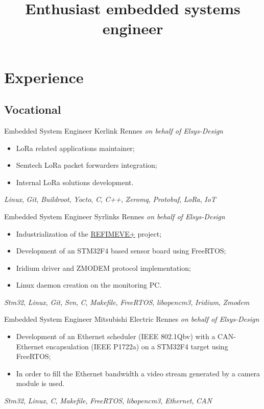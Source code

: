 \documentclass[11pt,a4paper,sans]{moderncv}
\title{Enthusiast embedded systems engineer}
\begin{document}
\makecvtitle

\section{Experience}
\subsection{Vocational}
	{Embedded System Engineer}
	{Kerlink}
	{Rennes}
	{\textit{on behalf of Elsys-Design}}
	{
		\begin{itemize}
		\item LoRa related applications maintainer;
		\item Semtech LoRa packet forwarders integration;
		\item Internal LoRa solutions development.
		\end{itemize}
		\textit{Linux},
		\textit{Git},
		\textit{Buildroot}, \textit{Yocto},
		\textit{C}, \textit{C++},
		\textit{Zeromq}, \textit{Protobuf},
		\textit{LoRa}, \textit{IoT}
	}
	{Embedded System Engineer}
	{Syrlinks}
	{Rennes}
	{\textit{on behalf of Elsys-Design}}
	{
		\begin{itemize}
		\item Industrialization of the
			\href{http://www.refimeve.fr}{REFIMEVE+} project;
		\item Development of an STM32F4 based sensor board using FreeRTOS;
		\item Iridium driver and ZMODEM protocol implementation;
		\item Linux daemon creation on the monitoring PC.
		\end{itemize}
		\textit{Stm32},
		\textit{Linux},
		\textit{Git}, \textit{Svn},
		\textit{C}, \textit{Makefile},
		\textit{FreeRTOS}, \textit{libopencm3},
		\textit{Iridium}, \textit{Zmodem}
	}
	{Embedded System Engineer}
	{Mitsubishi Electric}
	{Rennes}
	{\textit{on behalf of Elsys-Design}}
	{
		\begin{itemize}
		\item Development of an Ethernet scheduler (IEEE 802.1Qbv)
			with a CAN-Ethernet encapsulation (IEEE P1722a)
			on a STM32F4 target using FreeRTOS;
		\item In order to fill the Ethernet bandwidth a video stream
			generated by a camera module is used.
		\end{itemize}
		\textit{Stm32},
		\textit{Linux},
		\textit{C}, \textit{Makefile},
		\textit{FreeRTOS}, \textit{libopencm3},
		\textit{Ethernet}, \textit{CAN}
	}
\end{document}
